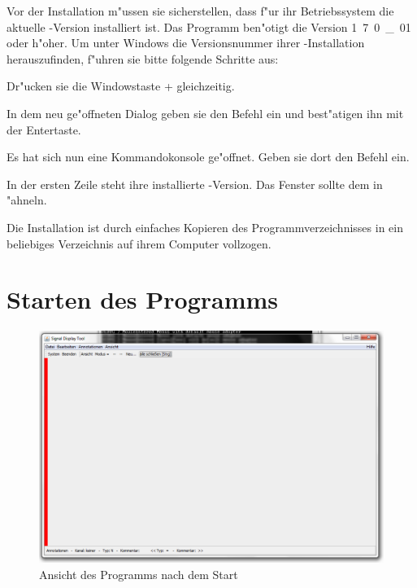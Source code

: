 Vor der Installation m"ussen sie sicherstellen, dass f"ur ihr Betriebssystem die aktuelle \javaNS-Version installiert ist.
Das Programm ben"otigt die Version \unit{1.7.0\_01} oder h"oher.
Um unter Windows die Versionsnummer ihrer \javaNS-Installation herauszufinden, f"uhren sie bitte folgende Schritte aus:
\begin{enumerate}
	{%
	\renewcommand{\theenumi}{\arabic{enumi}}
	\renewcommand{\labelenumi}{{\theenumi}.}
	\item Dr"ucken sie die Windowstaste +  gleichzeitig.
	\item In dem neu ge"offneten Dialog geben sie den Befehl  ein und best"atigen ihn mit der Entertaste.
	\item Es hat sich nun eine Kommandokonsole ge"offnet. Geben sie dort den Befehl  ein.
	\item In der ersten Zeile steht ihre installierte \javaNS-Version. Das Fenster sollte dem in  "ahneln.
	}
\end{enumerate}
Die Installation ist durch einfaches Kopieren des Programmverzeichnisses in ein beliebiges Verzeichnis auf ihrem Computer vollzogen.

\section{Starten des Programms}

\begin{figure}[htb]
\centering
\includegraphics[width=\textwidth]{bilder/window.png}
\caption{Ansicht des Programms nach dem Start}
\label{pic:program_start}
\end{figure}

